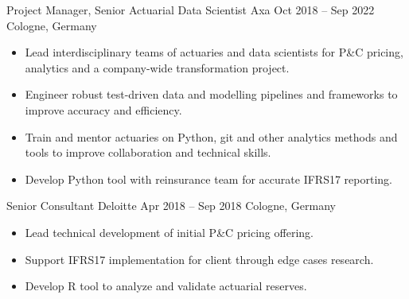 \documentclass[a4paper,]{fortysecondscv}
\begin{document}
\begin{cvtable}
    \vspace{\topsep}
    \cvitemoneblock
    {Project Manager, Senior Actuarial Data Scientist}
    {Axa}
    {Oct 2018 -- Sep 2022}
    {Cologne, Germany}
    {
        \begin{itemize}[nosep, leftmargin=12pt , label={-}] %
            \item Lead interdisciplinary teams of actuaries and data scientists for P\&C pricing, analytics and a company-wide transformation project.
            \item Engineer robust test-driven data and modelling pipelines and frameworks to improve accuracy and efficiency.
            \item Train and mentor actuaries on Python, git and other analytics methods and tools to improve collaboration and technical skills.
            \item Develop Python tool with reinsurance team for accurate IFRS17 reporting.
        \end{itemize}
    }
    \vspace{\topsep}
    \cvitemoneblock
    {Senior Consultant}
    {Deloitte}
    {Apr 2018 -- Sep 2018}
    {Cologne, Germany}
    {
        \begin{itemize}[nosep, leftmargin=12pt , label={-}] %
            \item Lead technical development of initial P\&C pricing offering.
            \item Support IFRS17 implementation for client through edge cases research.
            \item Develop R tool to analyze and validate actuarial reserves.

\end{itemize}}
\end{cvtable}
\end{document}
